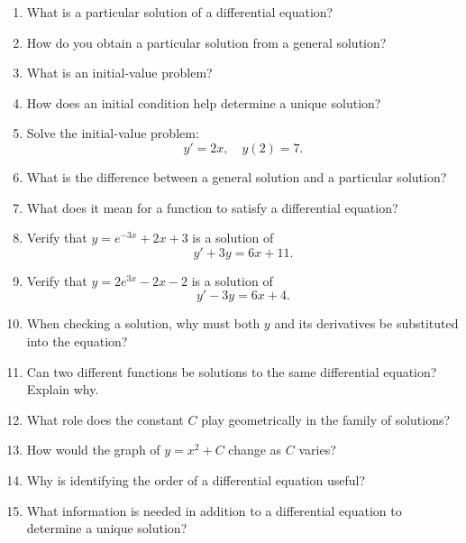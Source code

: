 \begin{enumerate}
\item What is a particular solution of a differential equation?

\item How do you obtain a particular solution from a general solution?

\item What is an initial-value problem?

\item How does an initial condition help determine a unique solution?

\item Solve the initial-value problem:
  \[
    y' = 2x, \quad y(2) = 7.
  \]

\item What is the difference between a general solution and a particular solution?

\item What does it mean for a function to satisfy a differential equation?

\item Verify that $y = e^{-3x} + 2x + 3$ is a solution of
  \[
    y' + 3y = 6x + 11.
  \]

\item Verify that $y = 2e^{3x} - 2x - 2$ is a solution of
  \[
    y' - 3y = 6x + 4.
  \]

\item When checking a solution, why must both $y$ and its derivatives be substituted into the equation?

\item Can two different functions be solutions to the same differential equation? Explain why.

\item What role does the constant $C$ play geometrically in the family of solutions?

\item How would the graph of $y = x^2 + C$ change as $C$ varies?

\item Why is identifying the order of a differential equation useful?

\item What information is needed in addition to a differential equation to determine a unique solution?

\end{enumerate}
